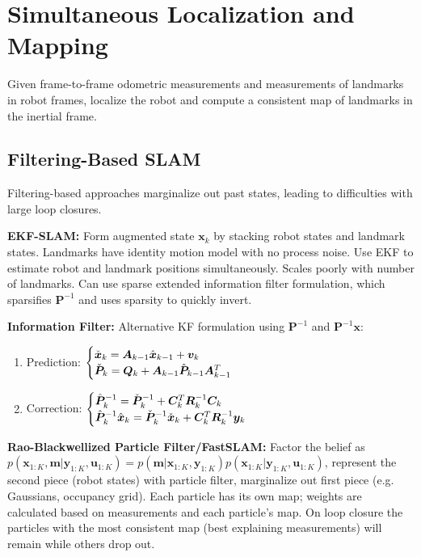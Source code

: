 \documentclass[twocolumn, 8pt]{extarticle}
\begin{document}
\section{Simultaneous Localization and Mapping} %

Given frame-to-frame odometric measurements and measurements of landmarks in robot frames, localize the robot and
compute a consistent map of landmarks in the inertial frame.

\subsection{Filtering-Based SLAM}

Filtering-based approaches marginalize out past states, leading to difficulties with large loop closures.

\textbf{EKF-SLAM:} Form augmented state \(\bm x_k\) by stacking robot states and landmark states. Landmarks have
identity motion model with no process noise. Use EKF to estimate robot and landmark positions simultaneously.
Scales poorly with number of landmarks. Can use sparse extended information filter formulation, which sparsifies
\(\bm P^{-1}\) and uses sparsity to quickly invert.

\textbf{Information Filter:} Alternative KF formulation using \(\bm P^{-1}\) and \(\bm P^{-1}\bm x\):
\begin{enumerate}
  \item Prediction: $\begin{cases} {\check{\bm x}_k = \bm A_{k - 1}\hat{\bm x}_{k - 1} + \bm v_k} \\ {\check{\bm P}_k = \bm Q_k + \bm A_{k - 1}\hat{\bm P}_{k - 1}\bm A_{k - 1}^T} \end{cases}$
  \item Correction: $\begin{cases} {\hat{\bm P}_k^{-1} = \check{\bm P}_k^{-1} + \bm C_k^T\bm R_k^{-1}\bm C_k} \\ {\hat{\bm P}_k^{-1}\hat{\bm x}_k = \check{\bm P}_k^{-1}\check{\bm x}_k + \bm C_k^T\bm R_k^{-1}\bm y_k} \end{cases}$
\end{enumerate}

\textbf{Rao-Blackwellized Particle Filter/FastSLAM:} Factor the belief as
\(p(\bm x_{1:K}, \bm m | \bm y_{1:K}, \bm u_{1:K}) = p(\bm m | \bm x_{1:K}, \bm y_{1:K})p(\bm x_{1:K} | \bm y_{1:K}, \bm u_{1:K})\),
represent the second piece (robot states) with particle filter, marginalize out first piece (e.g. Gaussians, occupancy
grid). Each particle has its own map; weights are calculated based on measurements and each particle's map.
On loop closure the particles with the most consistent map (best explaining measurements) will remain while others drop out.
\end{document}
